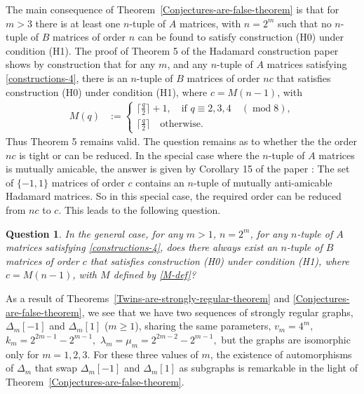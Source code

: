 \documentclass[12pt,a4paper]{article}
\newtheorem{Question}{Question}
\begin{document}
The main consequence of Theorem~\ref{Conjectures-are-false-theorem} is that for $m>3$ there is at least one $n$-tuple of $A$ matrices,
with $n=2^m$ such that no $n$-tuple of $B$ matrices of order $n$ can be found to satisfy construction (H0) under condition (H1).
The proof of Theorem 5 of the Hada\-mard construction paper \cite{Leo14Constructions} shows by construction that for any $m$,
and any $n$-tuple of $A$ matrices satisfying \eqref{constructions-4}, there is an $n$-tuple of $B$ matrices of order $nc$ that
satisfies construction (H0) under condition (H1), where $c=M(n-1)$, with
\begin{align}
M(q) &:=
\begin{cases}
\lceil \frac{q}{2} \rceil + 1, \quad \text{if~} q \equiv 2,3,4 \quad (\operatorname{mod} 8),
\\
\lceil \frac{q}{2} \rceil \quad \text{otherwise.}
\end{cases}
\label{M-def}
\end{align}
Thus Theorem 5 remains valid.
The question remains as to whether the the order $nc$ is tight or can be reduced.
In the special case where the $n$-tuple of $A$ matrices is mutually amicable, the answer is given by Corollary 15 of the paper \cite{Leo14Constructions}:
The set of $\{-1,1\}$ matrices of order $c$ contains an $n$-tuple of mutually anti-amicable Hada\-mard matrices.
So in this special case, the required order can be reduced from $nc$ to $c$.
This leads to the following question.
\begin{Question}
In the general case, for any $m>1$, $n=2^m$, for any $n$-tuple of $A$ matrices satisfying \eqref{constructions-4},
does there always exist an $n$-tuple of $B$ matrices of order $c$ that
satisfies construction (H0) under condition (H1), where $c=M(n-1)$, with $M$ defined by \eqref{M-def}?
\end{Question}

As a result of Theorems~\ref{Twins-are-strongly-regular-theorem} and \ref{Conjectures-are-false-theorem},
we see that we have two sequences of strongly regular graphs, $\varDelta_m[-1]$ and $\varDelta_m[1]$ ($m \geqslant 1$),
sharing the same parameters,
$v_m = 4^m,$ $k_m = 2^{2 m - 1} - 2^{m - 1},$ $\lambda_m=\mu_m=2^{2 m - 2} - 2^{m - 1},$
but the graphs are isomorphic only for $m=1, 2, 3$.
For these three values of $m$, the existence of
automorphisms of $\varDelta_m$ that swap $\varDelta_m[-1]$ and $\varDelta_m[1]$
as subgraphs \cite[Table 1]{Leo14Constructions}
is remarkable in the light of Theorem~\ref{Conjectures-are-false-theorem}.
\end{document}
